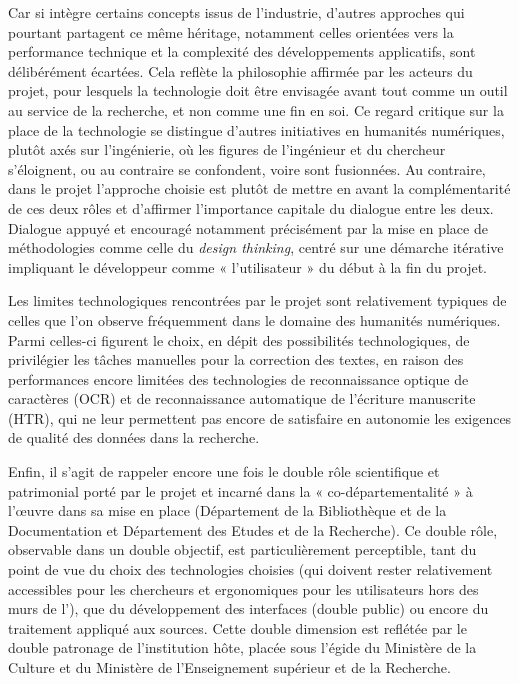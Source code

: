 Car si \pense intègre certains concepts issus de l'industrie, d'autres approches qui pourtant partagent ce même héritage, notamment celles orientées vers la performance technique et la complexité des développements applicatifs, sont délibérément écartées. Cela reflète la philosophie affirmée par les acteurs du projet, pour lesquels la technologie doit être envisagée avant tout comme un outil au service de la recherche, et non comme une fin en soi. Ce regard critique sur la place de la technologie se distingue d’autres initiatives en humanités numériques, plutôt axés sur l’ingénierie, où les figures de l’ingénieur et du chercheur s’éloignent, ou au contraire se confondent, voire sont fusionnées. Au contraire, dans le projet \pense l’approche choisie est plutôt de mettre en avant la complémentarité de ces deux rôles et d’affirmer l’importance capitale du dialogue entre les deux. Dialogue appuyé et encouragé notamment précisément par la mise en place de méthodologies comme celle du \textit{design thinking}, centré sur une démarche itérative impliquant le développeur comme « l’utilisateur » du début à la fin du projet.

Les limites technologiques rencontrées par le projet \pense sont relativement typiques de celles que l’on observe fréquemment dans le domaine des humanités numériques. Parmi celles-ci figurent le choix, en dépit des possibilités technologiques, de privilégier les tâches manuelles pour la correction des textes, en raison des performances encore limitées des technologies de reconnaissance optique de caractères (OCR) et de reconnaissance automatique de l’écriture manuscrite (HTR), qui ne leur permettent pas encore de satisfaire en autonomie les exigences de qualité des données dans la recherche. 

Enfin, il s’agit de rappeler encore une fois le double rôle scientifique et patrimonial porté par le projet \pense et incarné dans la « co-départementalité » à l’œuvre dans sa mise en place (Département de la Bibliothèque et de la Documentation et Département des Etudes et de la Recherche). Ce double rôle, observable dans un double objectif, est particulièrement perceptible, tant du point de vue du choix des technologies choisies (qui doivent rester relativement accessibles pour les chercheurs et ergonomiques pour les utilisateurs hors des murs de l’\inha), que du développement des interfaces (double public) ou encore du traitement appliqué aux sources. Cette double dimension est reflétée par le double patronage de l’institution hôte, placée sous l’égide du Ministère de la Culture et du Ministère de l’Enseignement supérieur et de la Recherche.  
